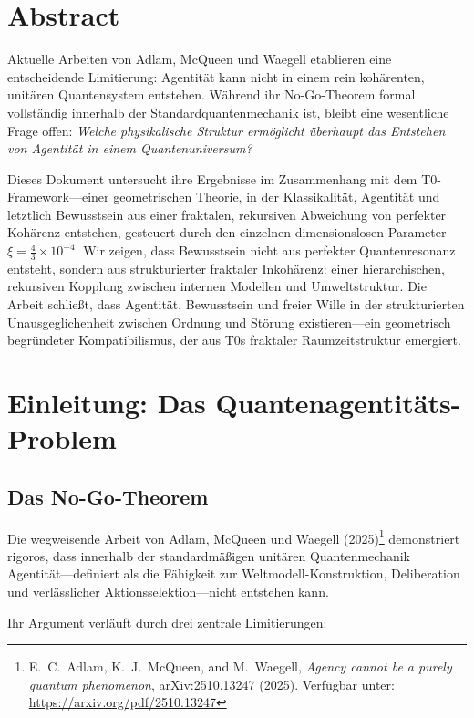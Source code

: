 \section*{Abstract}
		Aktuelle Arbeiten von Adlam, McQueen und Waegell etablieren eine entscheidende Limitierung: Agentität kann nicht in einem rein kohärenten, unitären Quantensystem entstehen. Während ihr No-Go-Theorem formal vollständig innerhalb der Standardquantenmechanik ist, bleibt eine wesentliche Frage offen: \emph{Welche physikalische Struktur ermöglicht überhaupt das Entstehen von Agentität in einem Quantenuniversum?}
		
		Dieses Dokument untersucht ihre Ergebnisse im Zusammenhang mit dem T0-Framework—einer geometrischen Theorie, in der Klassikalität, Agentität und letztlich Bewusstsein aus einer fraktalen, rekursiven Abweichung von perfekter Kohärenz entstehen, gesteuert durch den einzelnen dimensionslosen Parameter $\xi = \frac{4}{3} \times 10^{-4}$. Wir zeigen, dass Bewusstsein nicht aus perfekter Quantenresonanz entsteht, sondern aus strukturierter fraktaler Inkohärenz: einer hierarchischen, rekursiven Kopplung zwischen internen Modellen und Umweltstruktur. Die Arbeit schließt, dass Agentität, Bewusstsein und freier Wille in der strukturierten Unausgeglichenheit zwischen Ordnung und Störung existieren—ein geometrisch begründeter Kompatibilismus, der aus T0s fraktaler Raumzeitstruktur emergiert.

	
	
	
	
	\section{Einleitung: Das Quantenagentitäts-Problem}
	
	\subsection{Das No-Go-Theorem}
	
	Die wegweisende Arbeit von Adlam, McQueen und Waegell (2025)\footnote{E.~C.~Adlam, K.~J.~McQueen, and M.~Waegell, \emph{Agency cannot be a purely quantum phenomenon}, arXiv:2510.13247 (2025). Verfügbar unter: \url{https://arxiv.org/pdf/2510.13247}} demonstriert rigoros, dass innerhalb der standardmäßigen unitären Quantenmechanik Agentität—definiert als die Fähigkeit zur Weltmodell-Konstruktion, Deliberation und verlässlicher Aktionsselektion—nicht entstehen kann.
	
	Ihr Argument verläuft durch drei zentrale Limitierungen:
	
